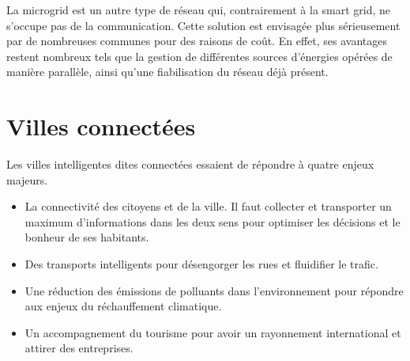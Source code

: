 
La microgrid est un autre type de réseau qui, contrairement à la smart grid, ne s'occupe pas de la communication.
Cette solution est envisagée plus sérieusement par de nombreuses communes pour des raisons de coût. En effet, ses
avantages restent nombreux tels que la gestion de différentes sources d'énergies opérées de manière parallèle,
ainsi qu'une fiabilisation du réseau déjà présent.




\section{Villes connectées}

Les villes intelligentes dites connectées essaient de répondre à quatre enjeux majeurs.
\begin{itemize}
    \item La connectivité des citoyens et de la ville. Il faut collecter et transporter un maximum d'informations dans les
deux sens pour optimiser les décisions et le bonheur de ses habitants.
    \item Des transports intelligents pour désengorger les rues et fluidifier le trafic.
    \item Une réduction des émissions de polluants dans l'environnement pour répondre aux enjeux du
réchauffement climatique.
    \item Un accompagnement du tourisme pour avoir un rayonnement international et attirer des entreprises.
\end{itemize}

